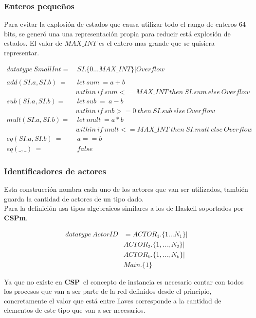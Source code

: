 \documentclass[fleqn]{article}
\newcommand{\CSP}{\textbf{CSP}}
\newcommand{\CSPm}{\textbf{CSPm}}
\begin{document}
\subsubsection{Enteros pequeños}

Para evitar la explosión de estados que causa utilizar todo el rango de enteros 64-bits, se generó una
una representación propia para reducir está explosión de estados. El valor de $MAX\_INT$ es el entero mas grande que se quisiera representar.

\begin{align*}
datatype\ SmallInt =&\ SI.\{0 \ldots MAX\_INT\} | Overflow \\
\\
add(SI.a, SI.b)\ =&\ let\ sum\ = a + b \\
&within\ if\ sum <= MAX\_INT\ then\ SI.sum\ else\ Overflow  \\
%
sub(SI.a, SI.b) =&\ let\ sub\ =\ a - b \\
& within\ if\ sub >= 0\ then\ SI.sub\ else\ Overflow \\
%
mult(SI.a, SI.b) =&\ let\ mult\ = a * b \\
& within\ if\ mult <= MAX\_INT\ then\ SI.mult\ else\ Overflow \\
eq(SI.a, SI.b)\ =&\ a == b \\
eq(\_, \_)\ =&\ false
\end{align*}


\subsubsection{Identificadores de actores}

Esta construcción nombra cada uno de los actores que van ser utilizados, también
guarda la cantidad de actores de un tipo dado. \\
Para la definición usa tipos algebraicos similares a los de Haskell soportados por \CSPm.

\begin{figure}[H]
\begin{align*}
  datatype\ ActorID &= ACTOR_1.\{1 \ldots N_1\} | \\
  & ACTOR_2.\{1, \ldots ,N_2\} | \\
  & ACTOR_k.\{1, \ldots, N_k\} | \\
  & Main.\{1\}
\end{align*}
\end{figure}

Ya que no existe en \CSP\ el concepto de instancia es necesario contar con todos los 
procesos que van a ser parte de la red definidos desde el principio, concretamente 
el valor que está entre llaves corresponde a la cantidad de elementos de este
tipo que van a ser necesarios. 
\end{document}
